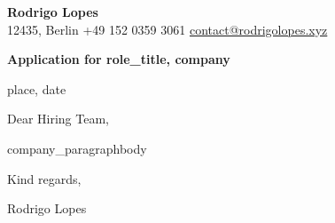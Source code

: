 \documentclass[11pt,a4paper]{article}
\begin{document}
\begin{center}
  {\Huge\bfseries Rodrigo Lopes} \\[6pt]
  12435, Berlin \textbar{} +49 152 0359 3061 \textbar{} \href{mailto:contact@rodrigolopes.xyz}{contact@rodrigolopes.xyz}
\end{center}

\vspace{40pt}

{\large\bfseries Application for {role_title}, {company}}

\vspace{30pt}

{place}, {date}

\vspace{25pt}

Dear Hiring Team,

\vspace{10pt}

{company_paragraph}{body}

\vspace{15pt}

Kind regards,

\vspace{1pt}

Rodrigo Lopes
\end{document}
